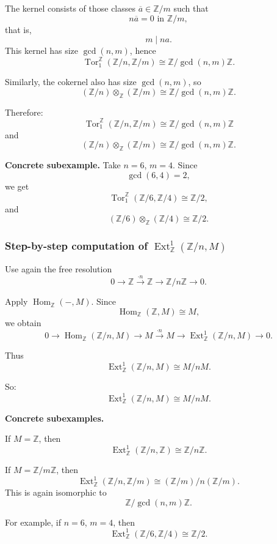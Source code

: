 \documentclass[12pt,a4paper]{article}
\theoremstyle{notespace}
\DeclareMathOperator{\Hom}{Hom}
\DeclareMathOperator{\Tor}{Tor}
\DeclareMathOperator{\Ext}{Ext}
\begin{document}
The kernel consists of those classes \(\overline a\in \mathbb Z/m\) such that
\[
n\overline a=0 \text{ in } \mathbb Z/m,
\]
that is,
\[
m \mid na.
\]
This kernel has size \(\gcd(n,m)\), hence
\[
\Tor_1^\mathbb Z(\mathbb Z/n,\mathbb Z/m)\cong \mathbb Z/\gcd(n,m)\mathbb Z.
\]

Similarly, the cokernel also has size \(\gcd(n,m)\), so
\[
(\mathbb Z/n)\otimes_\mathbb Z (\mathbb Z/m)\cong \mathbb Z/\gcd(n,m)\mathbb Z.
\]

Therefore:
\[
\boxed{
	\Tor_1^\mathbb Z(\mathbb Z/n,\mathbb Z/m)\cong \mathbb Z/\gcd(n,m)\mathbb Z
}
\]
and
\[
\boxed{
	(\mathbb Z/n)\otimes_\mathbb Z (\mathbb Z/m)\cong \mathbb Z/\gcd(n,m)\mathbb Z.
}
\]

\medskip

\textbf{Concrete subexample.}
Take \(n=6\), \(m=4\). Since
\[
\gcd(6,4)=2,
\]
we get
\[
\Tor_1^\mathbb Z(\mathbb Z/6,\mathbb Z/4)\cong \mathbb Z/2,
\]
and
\[
(\mathbb Z/6)\otimes_\mathbb Z (\mathbb Z/4)\cong \mathbb Z/2.
\]

\subsubsection{Step-by-step computation of \(\Ext_\mathbb Z^1(\mathbb Z/n,M)\)}

Use again the free resolution
\[
0\longrightarrow \mathbb Z \xrightarrow{\cdot n} \mathbb Z \longrightarrow \mathbb Z/n\mathbb Z \longrightarrow 0.
\]

Apply \(\Hom_\mathbb Z(-,M)\). Since
\[
\Hom_\mathbb Z(\mathbb Z,M)\cong M,
\]
we obtain
\[
0\longrightarrow \Hom_\mathbb Z(\mathbb Z/n,M)\longrightarrow M \xrightarrow{\cdot n} M \longrightarrow \Ext_\mathbb Z^1(\mathbb Z/n,M)\longrightarrow 0.
\]

Thus
\[
\Ext_\mathbb Z^1(\mathbb Z/n,M)\cong M/nM.
\]

So:
\[
\boxed{
	\Ext_\mathbb Z^1(\mathbb Z/n,M)\cong M/nM.
}
\]

\medskip

\textbf{Concrete subexamples.}

If \(M=\mathbb Z\), then
\[
\Ext_\mathbb Z^1(\mathbb Z/n,\mathbb Z)\cong \mathbb Z/n\mathbb Z.
\]

If \(M=\mathbb Z/m\mathbb Z\), then
\[
\Ext_\mathbb Z^1(\mathbb Z/n,\mathbb Z/m)\cong (\mathbb Z/m)/n(\mathbb Z/m).
\]
This is again isomorphic to
\[
\mathbb Z/\gcd(n,m)\mathbb Z.
\]

For example, if \(n=6\), \(m=4\), then
\[
\Ext_\mathbb Z^1(\mathbb Z/6,\mathbb Z/4)\cong \mathbb Z/2.
\]
\end{document}

